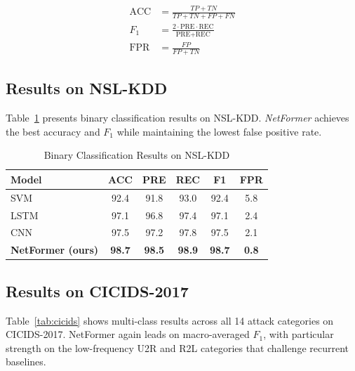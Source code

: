 \documentclass[conference]{IEEEtran}
\begin{document}
\begin{align}
	\text{ACC} & = \frac{TP + TN}{TP + TN + FP + FN}          \\[4pt]
	F_1        & = \frac{2 \cdot \text{PRE} \cdot \text{REC}}
	{\text{PRE} + \text{REC}}                                 \\[4pt]
	\text{FPR} & = \frac{FP}{FP + TN}
\end{align}

\subsection{Results on NSL-KDD}

Table~\ref{tab:nslkdd} presents binary classification results on
NSL-KDD. \textit{NetFormer} achieves the best accuracy and $F_1$
while maintaining the lowest false positive rate.

\begin{table}[h]
	\caption{Binary Classification Results on NSL-KDD}
	\label{tab:nslkdd}
	\centering
	\begin{tabular}{@{} l c c c c c @{}}
		\toprule
		\textbf{Model}            & \textbf{ACC}  & \textbf{PRE}  & \textbf{REC}
		                          & \textbf{F1}   & \textbf{FPR}                              \\
		\midrule
		SVM~\cite{ref:tsai2009}   & 92.4          & 91.8          & 93.0         & 92.4 & 5.8 \\
		LSTM~\cite{ref:kim2016}   & 97.1          & 96.8          & 97.4         & 97.1 & 2.4 \\
		CNN                       & 97.5          & 97.2          & 97.8         & 97.5 & 2.1 \\
		\textbf{NetFormer (ours)} & \textbf{98.7} & \textbf{98.5}
		                          & \textbf{98.9} & \textbf{98.7}
		                          & \textbf{0.8}                                              \\
		\bottomrule
	\end{tabular}
\end{table}

\subsection{Results on CICIDS-2017}

Table~\ref{tab:cicids} shows multi-class results across all 14 attack
categories on CICIDS-2017. NetFormer again leads on macro-averaged
$F_1$, with particular strength on the low-frequency U2R and R2L
categories that challenge recurrent baselines.
\end{document}
